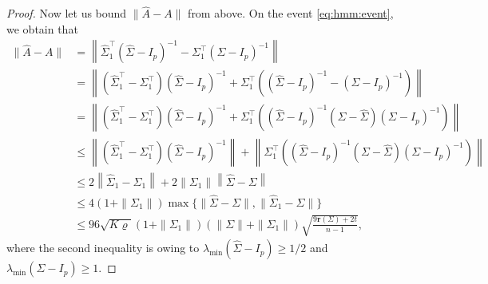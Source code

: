 \documentclass[11pt,a4paper]{article}
\theoremstyle{remark}
\theoremstyle{definition}
\newcommand{\bfA}{A}
\newcommand{\bfI}{I}
\newcommand{\bSigma}{\Sigma}
\newcommand{\er}{\mathbf{r}}
\theoremstyle{definition}
\renewcommand{\hat}{\widehat}
\begin{document}
\begin{bibunit}[apalike]
\begin{proof}
Now let us bound $\|\hat{\bfA}-\bfA\|$ from above.
On the event \eqref{eq:hmm:event}, we obtain that
\begin{align*}
  \|\hat{\bfA}-\bfA\|&= \left\|\hat{\bSigma}_{1}^{\top}(\hat{\bSigma}-\bfI_{p})^{-1}-\bSigma_{1}^{\top}(\bSigma-\bfI_{p})^{-1}\right\|\\
  &=\left\|\left(\hat{\bSigma}_{1}^{\top}-\bSigma_{1}^{\top}\right)(\hat{\bSigma}-\bfI_{p})^{-1}+\bSigma_{1}^{\top}\left((\hat{\bSigma}-\bfI_{p})^{-1}-(\bSigma-\bfI_{p})^{-1}\right)\right\|\\
  &=\left\|\left(\hat{\bSigma}_{1}^{\top}-\bSigma_{1}^{\top}\right)(\hat{\bSigma}-\bfI_{p})^{-1}+\bSigma_{1}^{\top}\left((\hat{\bSigma}-\bfI_{p})^{-1}(\bSigma-\hat{\bSigma})(\bSigma-\bfI_{p})^{-1}\right)\right\|\\
  &\le \left\|\left(\hat{\bSigma}_{1}^{\top}-\bSigma_{1}^{\top}\right)(\hat{\bSigma}-\bfI_{p})^{-1}\right\|+\left\|\bSigma_{1}^{\top}\left((\hat{\bSigma}-\bfI_{p})^{-1}(\bSigma-\hat{\bSigma})(\bSigma-\bfI_{p})^{-1}\right)\right\|\\
  &\le 2\left\|\hat{\bSigma}_{1}-\bSigma_{1}\right\|+2\left\|\bSigma_{1}\right\|\left\|\hat{\bSigma}-\bSigma\right\|\\
  &\le 4(1+\|\bSigma_{1}\|)\max\{\|\hat{\bSigma}-\bSigma\|,\|\hat{\bSigma}_{1}-\bSigma\|\}\\
  &\le 96\sqrt{K\varrho}\left(1+\|\bSigma_{1}\|\right)(\|\bSigma\|+\|\bSigma_{1}\|)\sqrt{\frac{9\er(\bSigma)+2t}{n-1}},
\end{align*}
where the second inequality is owing to $\lambda_{\min}(\hat{\bSigma}-\bfI_{p})\ge 1/2$ and $\lambda_{\min}(\bSigma-\bfI_{p})\ge 1$.
\end{proof}


\end{bibunit}
\end{document}
